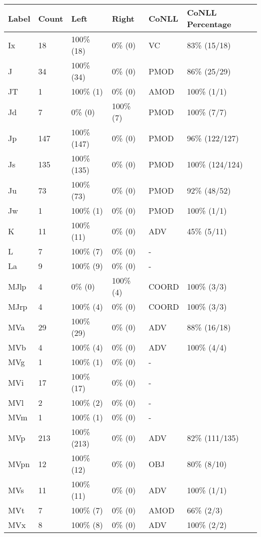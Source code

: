 \begin{figure*}
\begin{tabular}{|l|l|l|l||l|l|}
\hline
Label & Count & Left & Right & CoNLL & CoNLL Percentage\\ 
\hline
 Ix & 18 & 100\% (18) & 0\% (0) & VC & 83\% (15/18) \\ 
\hline
 J & 34 & 100\% (34) & 0\% (0) & PMOD & 86\% (25/29) \\ 
\hline
 JT & 1 & 100\% (1) & 0\% (0) & AMOD & 100\% (1/1) \\ 
\hline
 Jd & 7 & 0\% (0) & 100\% (7) & PMOD & 100\% (7/7) \\ 
\hline
 Jp & 147 & 100\% (147) & 0\% (0) & PMOD & 96\% (122/127) \\ 
\hline
 Js & 135 & 100\% (135) & 0\% (0) & PMOD & 100\% (124/124) \\ 
\hline
 Ju & 73 & 100\% (73) & 0\% (0) & PMOD & 92\% (48/52) \\ 
\hline
 Jw & 1 & 100\% (1) & 0\% (0) & PMOD & 100\% (1/1) \\ 
\hline
 K & 11 & 100\% (11) & 0\% (0) & ADV & 45\% (5/11) \\ 
\hline
 L & 7 & 100\% (7) & 0\% (0) & - &  \\ 
\hline
 La & 9 & 100\% (9) & 0\% (0) & - &  \\ 
\hline
 MJlp & 4 & 0\% (0) & 100\% (4) & COORD & 100\% (3/3) \\ 
\hline
 MJrp & 4 & 100\% (4) & 0\% (0) & COORD & 100\% (3/3) \\ 
\hline
 MVa & 29 & 100\% (29) & 0\% (0) & ADV & 88\% (16/18) \\ 
\hline
 MVb & 4 & 100\% (4) & 0\% (0) & ADV & 100\% (4/4) \\ 
\hline
 MVg & 1 & 100\% (1) & 0\% (0) & - &  \\ 
\hline
 MVi & 17 & 100\% (17) & 0\% (0) & - &  \\ 
\hline
 MVl & 2 & 100\% (2) & 0\% (0) & - &  \\ 
\hline
 MVm & 1 & 100\% (1) & 0\% (0) & - &  \\ 
\hline
 MVp & 213 & 100\% (213) & 0\% (0) & ADV & 82\% (111/135) \\ 
\hline
 MVpn & 12 & 100\% (12) & 0\% (0) & OBJ & 80\% (8/10) \\ 
\hline
 MVs & 11 & 100\% (11) & 0\% (0) & ADV & 100\% (1/1) \\ 
\hline
 MVt & 7 & 100\% (7) & 0\% (0) & AMOD & 66\% (2/3) \\ 
\hline
 MVx & 8 & 100\% (8) & 0\% (0) & ADV & 100\% (2/2) \\ 

\end{tabular}
\end{figure*}
